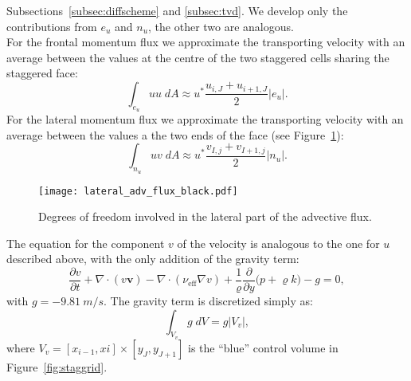 \begin{itemize}
	Subsections~\ref{subsec:diffscheme} and \ref{subsec:tvd}. We develop only 
	the contributions from $e_u$ and $n_u$, the other two are 
	analogous.\\
	For the frontal momentum flux we approximate the transporting velocity with 
	an average between the values at the centre of the two staggered cells 
	sharing the staggered face:
	\begin{equation}
		\int_{e_u} u u \; dA \approx u^* \frac{u_{i,J} + 
		u_{i+1,J}}{2}|e_u|.
	\end{equation}
	For the lateral momentum flux we approximate the transporting velocity with 
	an average between the values a the two ends of the face (see 
	Figure~\ref{fig:lat_adv_flux}):
	\begin{equation}
	\int_{n_u} u v \; dA \approx u^* \frac{v_{I,j} 
	+v_{I+1,j}}{2} |n_u|.
	\end{equation}
	\begin{figure}
		\centering
		\texttt{[image: lateral\_adv\_flux\_black.pdf]}
		\caption[Degrees of freedom involved in the lateral part of the 
		advective flux]{Degrees of freedom involved in the lateral part of the 
		advective flux.}
		\label{fig:lat_adv_flux}
	\end{figure}
\end{itemize}
The equation for the component $v$ of the velocity is analogous to the one for 
$u$ described above, with the only addition of the gravity term:
\begin{equation}
\frac{\partial v}{\partial t} + \nabla \cdot (v \mathbf{v}) - \nabla \cdot 
(\nu_\text{eff} \nabla v) + \frac{1}{\varrho}\frac{\partial}{\partial y} \big(p 
+ \varrho k\big) - g= 0,
\end{equation}
with $g = \SI{-9.81}{m/s}$. The gravity term is discretized simply as:
\begin{equation}
\int_{V_v} g \; dV = g |V_v|,
\end{equation}
where $V_v = [x_{i-1}, xi] \times [y_J, y_{J+1}]$ is the ``blue'' control 
volume in Figure~\ref{fig:staggrid}.
%
